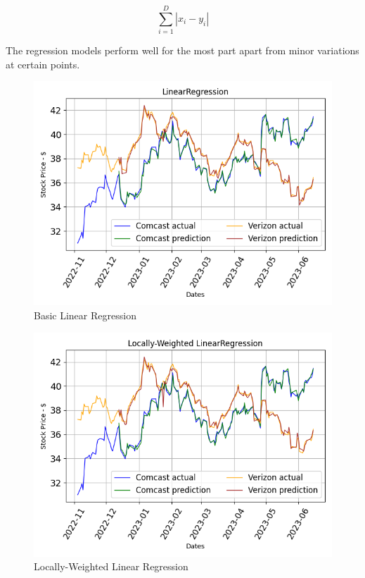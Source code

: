 \documentclass[conference]{IEEEtran}
\begin{document}
\begin{equation}
    \sum_{i=1}^{D}|x_i-y_i|
    \label{eq:mae}
\end{equation}

The regression models perform well for the most part apart from minor variations at certain points.

\begin{figure}[b]
    \includegraphics[width=\columnwidth]{LinearRegression}
    \caption{Basic Linear Regression}
    \label{fig:lr}
\end{figure}

\begin{figure}
    \includegraphics[width=\columnwidth]{Locally-Weighted LinearRegression}
    \caption{Locally-Weighted Linear Regression}
    \label{fig:lwlr}
\end{figure}
\end{document}
